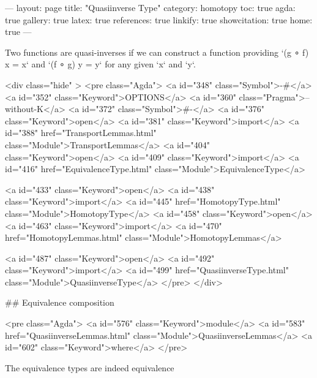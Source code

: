 ---
layout: page
title: "Quasiinverse Type"
category: homotopy
toc: true
agda: true
gallery: true
latex: true
references: true
linkify: true
showcitation: true
home: true
---

Two functions are quasi-inverses if we can construct a function providing
`(g ∘ f) x = x` and `(f ∘ g) y = y` for any given `x` and `y`.

<div class="hide" >
<pre class="Agda">
<a id="348" class="Symbol">{-#</a> <a id="352" class="Keyword">OPTIONS</a> <a id="360" class="Pragma">--without-K</a> <a id="372" class="Symbol">#-}</a>
<a id="376" class="Keyword">open</a> <a id="381" class="Keyword">import</a> <a id="388" href="TransportLemmas.html" class="Module">TransportLemmas</a>
<a id="404" class="Keyword">open</a> <a id="409" class="Keyword">import</a> <a id="416" href="EquivalenceType.html" class="Module">EquivalenceType</a>

<a id="433" class="Keyword">open</a> <a id="438" class="Keyword">import</a> <a id="445" href="HomotopyType.html" class="Module">HomotopyType</a>
<a id="458" class="Keyword">open</a> <a id="463" class="Keyword">import</a> <a id="470" href="HomotopyLemmas.html" class="Module">HomotopyLemmas</a>


<a id="487" class="Keyword">open</a> <a id="492" class="Keyword">import</a> <a id="499" href="QuasiinverseType.html" class="Module">QuasiinverseType</a>
</pre>
</div>

## Equivalence composition

<pre class="Agda">
<a id="576" class="Keyword">module</a> <a id="583" href="QuasiinverseLemmas.html" class="Module">QuasiinverseLemmas</a> <a id="602" class="Keyword">where</a>
</pre>

The equivalence types are indeed equivalence

